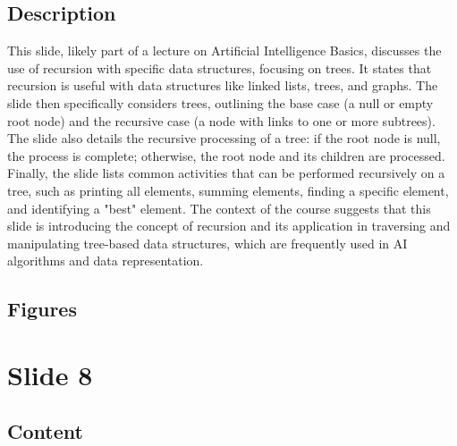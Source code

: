 \documentclass{article}%
\begin{document}
\subsection{Description}%
This slide, likely part of a lecture on Artificial Intelligence Basics, discusses the use of recursion with specific data structures, focusing on trees.  It states that recursion is useful with data structures like linked lists, trees, and graphs.  The slide then specifically considers trees, outlining the base case (a null or empty root node) and the recursive case (a node with links to one or more subtrees).  The slide also details the recursive processing of a tree: if the root node is null, the process is complete; otherwise, the root node and its children are processed.  Finally, the slide lists common activities that can be performed recursively on a tree, such as printing all elements, summing elements, finding a specific element, and identifying a "best" element.  The context of the course suggests that this slide is introducing the concept of recursion and its application in traversing and manipulating tree-based data structures, which are frequently used in AI algorithms and data representation.%
\subsection{Figures}%
\begin{figure}[H]%
\centering%
\end{figure}

%
\newpage%
\section{Slide 8}%
\label{sec:Slide8}%
\subsection{Content}%
\end{document}
